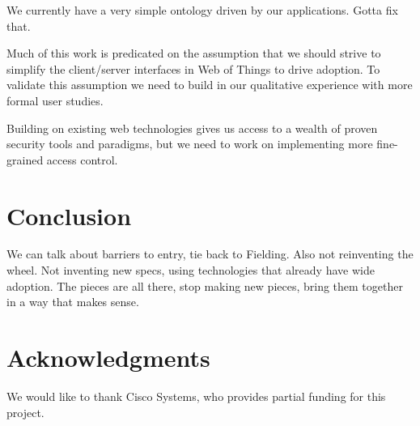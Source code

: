 \documentclass{acm_proc_article-sp}
\begin{document}
We currently have a very simple ontology driven by our applications. Gotta fix
that.

Much of this work is predicated on the assumption that we should strive to
simplify the client/server interfaces in Web of Things to drive adoption. To
validate this assumption we need to build in our qualitative experience with
more formal user studies.

Building on existing web technologies gives us access to a wealth of proven
security tools and paradigms, but we need to work on implementing more
fine-grained access control.

\section{Conclusion}
We can talk about barriers to entry, tie back to Fielding. Also not reinventing
the wheel. Not inventing new specs, using technologies that already have wide
adoption. The pieces are all there, stop making new pieces, bring them together
in a way that makes sense.

\section{Acknowledgments}
We would like to thank Cisco Systems, who provides partial funding for this
project.


%
%
\end{document}
